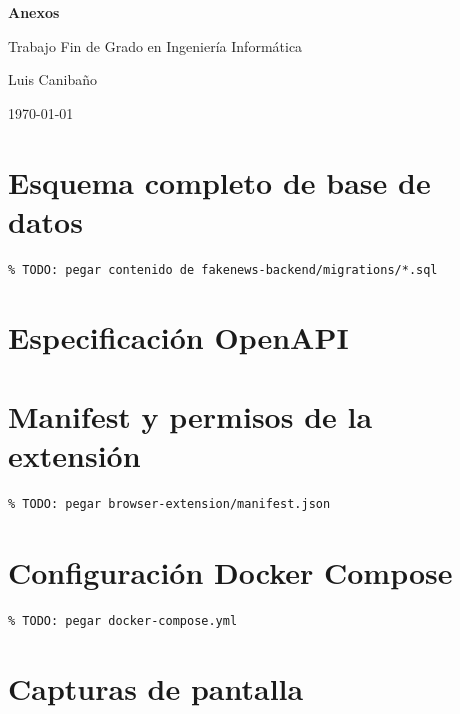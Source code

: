 \documentclass[12pt,a4paper,oneside]{report}
\begin{document}
\begin{titlepage}
  \centering
  \vspace*{4cm}
  {\Huge\bfseries Anexos\par}
  \vspace{1cm}
  {\Large Trabajo Fin de Grado en Ingeniería Informática\par}
  \vspace{0.5cm}
  {\large Luis Caniba\~no\par}
  \vfill
  {\large \today\par}
\end{titlepage}

\tableofcontents
\clearpage

\chapter{Esquema completo de base de datos}

\begin{verbatim}
% TODO: pegar contenido de fakenews-backend/migrations/*.sql
\end{verbatim}

\chapter{Especificación OpenAPI}


\chapter{Manifest y permisos de la extensión}

\begin{verbatim}
% TODO: pegar browser-extension/manifest.json
\end{verbatim}

\chapter{Configuración Docker Compose}

\begin{verbatim}
% TODO: pegar docker-compose.yml
\end{verbatim}

\chapter{Capturas de pantalla}
\end{document}

